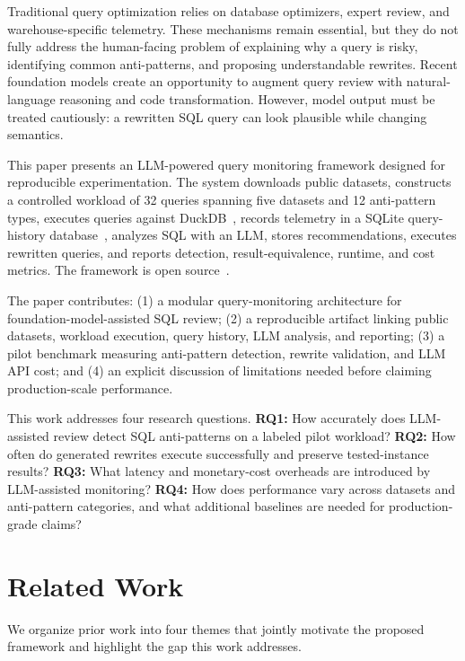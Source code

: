 \documentclass[conference]{IEEEtran}
\begin{document}
Traditional query optimization relies on database optimizers, expert review, and warehouse-specific telemetry. These mechanisms remain essential, but they do not fully address the human-facing problem of explaining why a query is risky, identifying common anti-patterns, and proposing understandable rewrites. Recent foundation models create an opportunity to augment query review with natural-language reasoning and code transformation. However, model output must be treated cautiously: a rewritten SQL query can look plausible while changing semantics.

This paper presents an LLM-powered query monitoring framework designed for reproducible experimentation. The system downloads public datasets, constructs a controlled workload of 32 queries spanning five datasets and 12 anti-pattern types, executes queries against DuckDB~\cite{raasveldt2020duckdb}, records telemetry in a SQLite query-history database~\cite{sqlite2026}, analyzes SQL with an LLM, stores recommendations, executes rewritten queries, and reports detection, result-equivalence, runtime, and cost metrics. The framework is open source~\cite{sharma2026framework}.

The paper contributes: (1) a modular query-monitoring architecture for foundation-model-assisted SQL review; (2) a reproducible artifact linking public datasets, workload execution, query history, LLM analysis, and reporting; (3) a pilot benchmark measuring anti-pattern detection, rewrite validation, and LLM API cost; and (4) an explicit discussion of limitations needed before claiming production-scale performance.

This work addresses four research questions. \textbf{RQ1:} How accurately does LLM-assisted review detect SQL anti-patterns on a labeled pilot workload? \textbf{RQ2:} How often do generated rewrites execute successfully and preserve tested-instance results? \textbf{RQ3:} What latency and monetary-cost overheads are introduced by LLM-assisted monitoring? \textbf{RQ4:} How does performance vary across datasets and anti-pattern categories, and what additional baselines are needed for production-grade claims?

\section{Related Work}
We organize prior work into four themes that jointly motivate the proposed framework and highlight the gap this work addresses.
\end{document}
